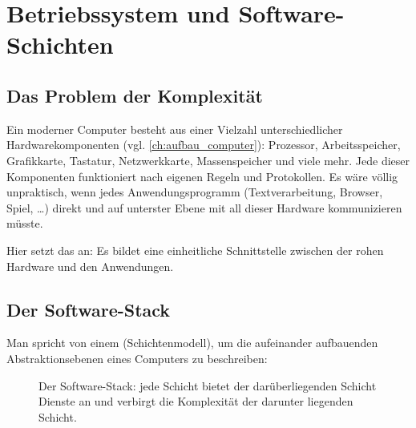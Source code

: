 \chapter{Betriebssystem und Software-Schichten}\label{ch:betriebssystem}

\section{Das Problem der Komplexität}

Ein moderner Computer besteht aus einer Vielzahl unterschiedlicher Hardwarekomponenten (vgl. \cref{ch:aufbau_computer}): Prozessor, Arbeitsspeicher, Grafikkarte, Tastatur, Netzwerkkarte, Massenspeicher und viele mehr. Jede dieser Komponenten funktioniert nach eigenen Regeln und Protokollen. Es wäre völlig unpraktisch, wenn jedes Anwendungsprogramm (Textverarbeitung, Browser, Spiel, \ldots) direkt und auf unterster Ebene mit all dieser Hardware kommunizieren müsste.

Hier setzt das  an: Es bildet eine einheitliche Schnittstelle zwischen der rohen Hardware und den Anwendungen.

\section{Der Software-Stack}

Man spricht von einem  (Schichtenmodell), um die aufeinander aufbauenden Abstraktionsebenen eines Computers zu beschreiben:

\begin{figure}[H]
    \centering
    \caption{Der Software-Stack: jede Schicht bietet der darüberliegenden Schicht Dienste an und verbirgt die Komplexität der darunter liegenden Schicht.}
    \label{fig:software_stack}
\end{figure}

